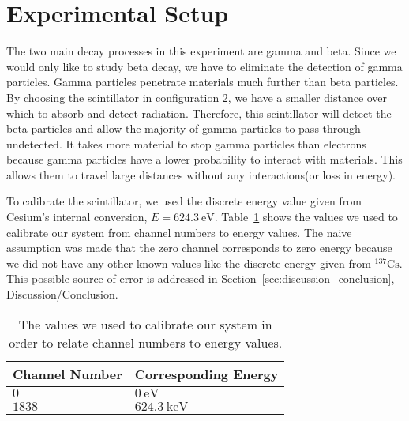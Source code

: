 \section{Experimental Setup} 

\label{sec:experimental_setup} The two main decay processes in this experiment are gamma and beta. Since we would only like to study beta decay, we have to eliminate the detection of gamma particles. Gamma particles penetrate materials much further than beta particles. By choosing the scintillator in configuration 2, we have a smaller distance over which to absorb and detect radiation. Therefore, this scintillator will detect the beta particles and allow the majority of gamma particles to pass through undetected. It takes more material to stop gamma particles than electrons because gamma particles have a lower probability to interact with materials.  This allows them to travel large distances without any interactions(or loss in energy).

To calibrate the scintillator, we used the discrete energy value given from Cesium's internal conversion, $E=624.3~\text{eV}$. Table~\ref{tab:calibrationNumbers} shows the values we used to calibrate our system from channel numbers to energy values.  The naive assumption was made that the zero channel corresponds to zero energy because we did not have any other known values like the discrete energy given from $^{137}\text{Cs}$. This possible source of error is addressed in Section~\ref{sec:discussion_conclusion}, Discussion/Conclusion.
\begin{table}
	[tbp] 
	\begin{center}
		\begin{tabular}
{ll} \toprule Channel Number & Corresponding Energy\\
                \midrule $0$ &        $0~\text{eV}$\\
                      $1838$ &    $624.3~\text{keV}$\\
\bottomrule 
		\end{tabular}
	\end{center}
	\caption{The values we used to calibrate our system in order to relate channel numbers to energy values.} \label{tab:calibrationNumbers} 
\end{table}%


